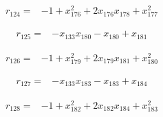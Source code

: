 \begin{align*}
r_{124}={}&-1+x_{176}^{2}+2x_{176}x_{178}+x_{177}^{2}
\end{align*}

\begin{align*}
r_{125}={}&-x_{133}x_{180}-x_{180}+x_{181}
\end{align*}

\begin{align*}
r_{126}={}&-1+x_{179}^{2}+2x_{179}x_{181}+x_{180}^{2}
\end{align*}

\begin{align*}
r_{127}={}&-x_{133}x_{183}-x_{183}+x_{184}
\end{align*}

\begin{align*}
r_{128}={}&-1+x_{182}^{2}+2x_{182}x_{184}+x_{183}^{2}
\end{align*}

